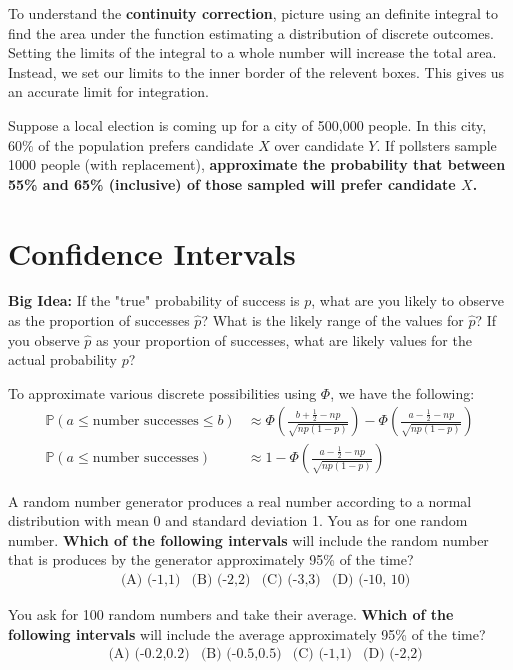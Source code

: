 \documentclass[titlepage, 12pt, leqno]{article}
\begin{document}
\begin{definition}
    To understand the \textbf{continuity correction}, picture using an definite integral to find the area under the function estimating a distribution of discrete outcomes. Setting the limits of the integral to a whole number will increase the total area. Instead, we set our limits to the inner border of the relevent boxes. This gives us an accurate limit for integration.
\end{definition}

\begin{ex}
    Suppose a local election is coming up for a city of 500,000 people. In this city, 60\% of the population prefers candidate $X$ over candidate $Y$. If pollsters sample 1000 people (with replacement), \textbf{approximate the probability that between 55\% and 65\% (inclusive) of those sampled will prefer candidate $X$.} 
\end{ex}

\pagebreak
\section{Confidence Intervals}
\textbf{Big Idea:} If the "true" probability of success is $p$, what are you likely to observe as the proportion of successes $\hat p$? What is the likely range of the values for $\hat p$? If you observe $\hat p$ as your proportion of successes, what are likely values for the actual probability $p$?

To approximate various discrete possibilities using $\Phi$, we have the following:
\begin{align*}
    \mathbb{P}(a \le \text{number successes} \le b) &\approx \Phi\left(\frac{b + \frac{1}{2} - np}{\sqrt{np(1-p)}}\right) - \Phi\left(\frac{a - \frac{1}{2} - np}{\sqrt{np(1-p)}}\right) \\
            \mathbb{P}(a \le \text{number successes}) &\approx 1 - \Phi\left(\frac{a - \frac{1}{2} - np}{\sqrt{np(1-p)}}\right)
\end{align*}


\begin{ex}
    A random number generator produces a real number according to a normal distribution with mean 0 and standard deviation 1. You as for one random number. \textbf{Which of the following intervals} will include the random number that is produces by the generator approximately 95\% of the time?
   \begin{align*}
       &\text{(A) (-1,1)} &\text{(B) (-2,2)} &\text{(C) (-3,3)} &\text{(D) (-10, 10)}
   \end{align*}
   
   You ask for 100 random numbers and take their average. \textbf{Which of the following intervals}  will include the average approximately 95\% of the time?
  \begin{align*}
      &\text{(A) (-0.2,0.2)} &\text{(B) (-0.5,0.5)} &\text{(C) (-1,1)} &\text{(D) (-2,2)}
  \end{align*}
\end{ex}
\end{document}
